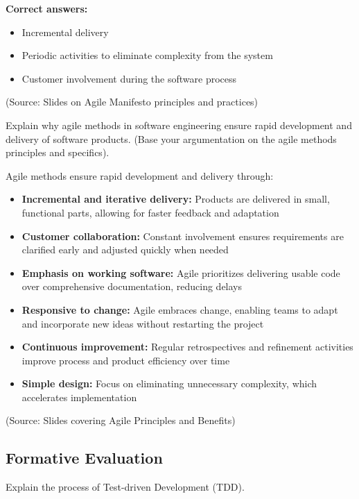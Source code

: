 \documentclass[12pt]{article}
\begin{document}
\textbf{Correct answers:}
\begin{itemize}
    \item Incremental delivery
    \item Periodic activities to eliminate complexity from the system
    \item Customer involvement during the software process
\end{itemize}

(Source: Slides on Agile Manifesto principles and practices)

\begin{questionbox}
Explain why agile methods in software engineering ensure rapid development and delivery of software products. (Base your argumentation on the agile methods principles and specifics).
\end{questionbox}

Agile methods ensure rapid development and delivery through:
\begin{itemize}
    \item \textbf{Incremental and iterative delivery:} Products are delivered in small, functional parts, allowing for faster feedback and adaptation
    \item \textbf{Customer collaboration:} Constant involvement ensures requirements are clarified early and adjusted quickly when needed
    \item \textbf{Emphasis on working software:} Agile prioritizes delivering usable code over comprehensive documentation, reducing delays
    \item \textbf{Responsive to change:} Agile embraces change, enabling teams to adapt and incorporate new ideas without restarting the project
    \item \textbf{Continuous improvement:} Regular retrospectives and refinement activities improve process and product efficiency over time
    \item \textbf{Simple design:} Focus on eliminating unnecessary complexity, which accelerates implementation
\end{itemize}

(Source: Slides covering Agile Principles and Benefits)

\subsection{Formative Evaluation}

\begin{questionbox}
Explain the process of Test-driven Development (TDD).
\end{questionbox}
\end{document}
